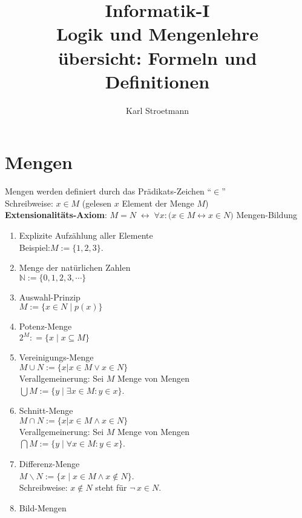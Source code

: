 \documentclass{article}
\title{Informatik-I \\
       {\Large Logik und Mengenlehre} \\
{\large \"{u}bersicht: Formeln und Definitionen}}
\author{Karl Stroetmann}
\begin{document}
\maketitle
\section{Mengen}
Mengen werden definiert durch das Pr\"{a}dikats-Zeichen ``$\in$'' 
\\[0.1cm]
\hspace*{1.3cm}
Schreibweise: $x \in M$ \quad (gelesen $x$ Element der Menge $M$)
\\[0.1cm] 
\textbf{Extensionalit\"{a}ts-Axiom}: \quad $M=N \;\leftrightarrow\; \forall x: \bigl( x \in M \leftrightarrow x \in N)$
Mengen-Bildung
\begin{enumerate}
\item Explizite Aufz\"{a}hlung aller Elemente 
      \\[0.1cm]
      \hspace*{1.3cm}
      Beispiel:\quad  $M := \{1,2,3\}$.
\item Menge der nat\"{u}rlichen Zahlen 
      \\[0.1cm]
      \hspace*{1.3cm}
      $\mathbb{N} := \{0,1,2,3, \cdots \}$
\item Auswahl-Prinzip 
      \\[0.1cm]
      \hspace*{1.3cm}
      $M := \{ x \in N \;|\; p(x) \}$
\item Potenz-Menge 
      \\[0.1cm]
      \hspace*{1.3cm}
      $2^M: = \{ x \;|\; x \subseteq M \}$
\item Vereinigungs-Menge 
      \\[0.1cm]
      \hspace*{1.3cm}
      $M \cup N := \{ x | x \in M \vee x \in N \}$
      \\[0.1cm]
      Verallgemeinerung:  Sei $M$ Menge von Mengen
      \\[0.1cm]
      \hspace*{1.3cm}
      $\bigcup M :=  \{ y \;|\; \exists x \in M: y \in x \}$.
\item Schnitt-Menge 
      \\[0.1cm]
      \hspace*{1.3cm}
      $M \cap N := \{ x | x \in M \wedge x \in N \}$
      \\[0.1cm]
      Verallgemeinerung:  Sei $M$ Menge von Mengen
      \\[0.1cm]
      \hspace*{1.3cm}
      $\bigcap M :=  \{ y \;|\; \forall x \in M: y \in x \}$.
\item Differenz-Menge \\[0.1cm]
      \hspace*{1.3cm} $M \backslash N := \{ x \mid x \in M \wedge x \not\in N \}$. 
      \\[0.1cm]
      \hspace*{1.3cm}
      Schreibweise: $x \not\in N$ steht f\"{u}r $\neg\, x \in N$.
\item Bild-Mengen 


\end{enumerate}
\end{document}
